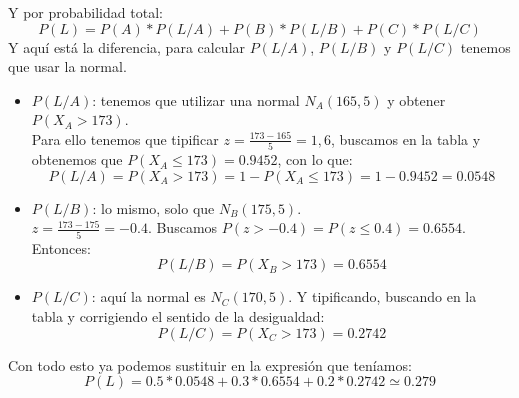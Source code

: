 \documentclass[a4paper,10pt,answers]{exam}
\begin{document}
\begin{questions}
\begin{solution}
\begin{itemize}
\end{itemize}
Y por probabilidad total:
\[P(L) = P(A) * P(L/A) + P(B) *P(L/B) + P(C) *P(L/C)\]
Y aquí está la diferencia, para calcular $P(L/A)$, $P(L/B)$ y $P(L/C)$ tenemos que usar la normal.
\begin{itemize}
	\item $P(L/A)$: tenemos que utilizar una normal $N_A (165, 5)$ y obtener $P(X_A > 173)$.\vspace{2mm}\\
	Para ello tenemos que tipificar $z=\frac{173 - 165}{5} = 1,6$, buscamos en la tabla y obtenemos que $P(X_A \leq 173) = 0.9452$, con lo que:
	\[P(L/A) = P(X_A > 173) = 1 - P(X_A \leq 173 )= 1 - 0.9452 = 0.0548\]
	\item $P(L/B)$: lo mismo, solo que $N_B (175, 5)$.\vspace{2mm}\\
	$z = \frac{173-175}{5} = -0.4$. Buscamos $P(z > -0.4 ) = P(z \leq 0.4) = 0.6554$. Entonces:
	\[P(L/B) = P(X_B > 173) = 0.6554\]
	\item $P(L/C)$: aquí la normal es $N_C(170, 5)$. Y tipificando, buscando en la tabla y corrigiendo el sentido de la desigualdad:
	\[P(L/C) = P(X_C > 173) = 0.2742\]
\end{itemize}
Con todo esto ya podemos sustituir en la expresión que teníamos:
\[P(L) = 0.5*0.0548+0.3*0.6554+0.2*0.2742 \simeq 0.279\]
\end{solution}
\end{questions}
\end{document}
